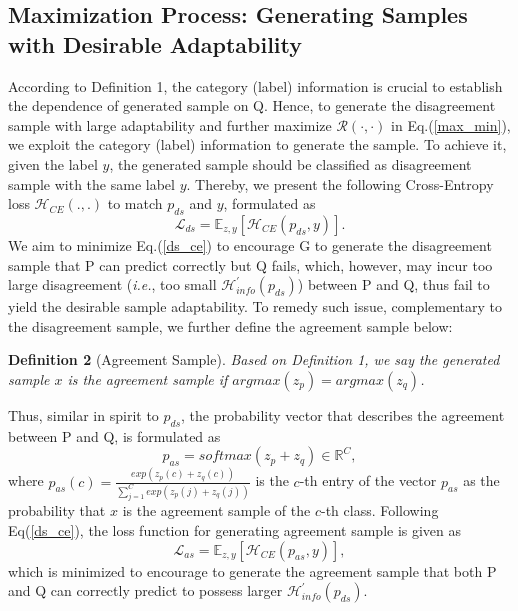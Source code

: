 \subsection{Maximization Process: Generating Samples with Desirable Adaptability}
\label{expanding_stage}
According to Definition 1, the category (label) information is crucial to establish the dependence of generated sample on Q.  Hence, to generate the disagreement sample with large adaptability and further maximize $\mathcal{R}(\cdot,\cdot)$ in Eq.(\ref{max_min}), we exploit the category (label) information to generate the sample. To achieve it, given the label $y$, the generated sample should be classified as disagreement sample with the same label $y$. Thereby, we present the following Cross-Entropy loss $\mathcal{H}_{CE}(.,.)$ to match $p_{ds}$ and $y$, formulated as
\begin{equation}
\mathcal{L}_{ds}=\mathbb{E}_{z,y}[\mathcal{H}_{CE}(p_{ds},y)].
\label{ds_ce}
\end{equation}
We aim to minimize Eq.(\ref{ds_ce}) to encourage G to generate the disagreement sample that P can predict correctly but Q fails, which, however, may incur too large disagreement (\emph{i.e.}, too small $\mathcal{H}^{'}_{info}(p_{ds})$) between P and Q, thus fail to yield the desirable sample adaptability. To remedy such issue, complementary to the disagreement sample, we further define the agreement sample below:

\noindent \textbf{Definition 2} (Agreement Sample). \emph{ Based on Definition 1, we say the generated sample $x$ is the agreement sample if $arg max(z_p)=arg max(z_q)$.}

\noindent Thus, similar in spirit to $p_{ds}$, the probability vector that describes the agreement between P and Q, is formulated as
\begin{equation}
p_{as}=softmax(z_p+z_q) \in \mathbb{R}^C,
\end{equation}
where $p_{as}(c)=\frac{exp(z_p(c)+z_q(c))}{\sum_{j=1}^{C} exp(z_p(j)+z_q(j))}$ is the $c$-th entry of the vector $p_{as}$ as the probability that $x$ is the agreement sample of the $c$-th class.
Following Eq(\ref{ds_ce}), the loss function for generating agreement sample is given as
\begin{equation}
\mathcal{L}_{as}=\mathbb{E}_{z,y}[\mathcal{H}_{CE}(p_{as},y)],
\label{las}
\end{equation}
which is minimized to encourage to generate the agreement sample that both P and Q can correctly predict to possess larger $\mathcal{H}^{'}_{info}(p_{ds})$.

